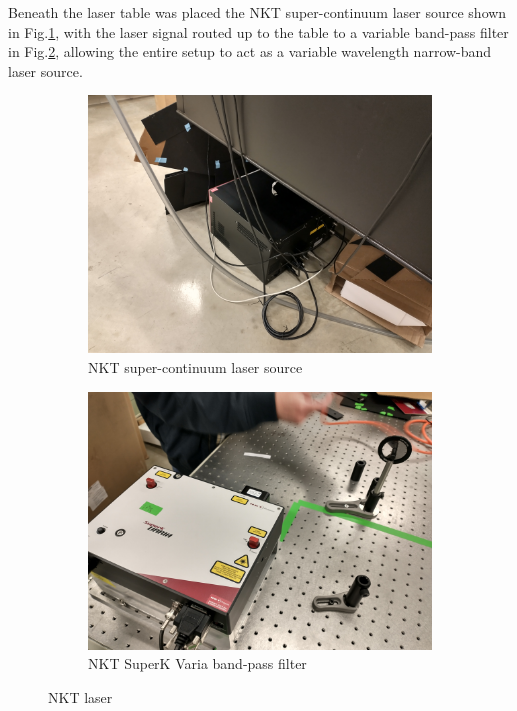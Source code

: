 \documentclass[a4paper]{article}
\begin{document}
Beneath the laser table was placed the NKT super-continuum laser source shown in Fig.\ref{fig:super_continuum}, with the laser signal routed up to the table to a variable band-pass filter in Fig.\ref{fig:band_pass}, allowing the entire setup to act as a variable wavelength narrow-band laser source.

\begin{figure}
     \centering
     \begin{subfigure}[b]{0.48\textwidth}
         \centering
         \includegraphics[width=\textwidth]{IMG_20220422_134723634_HDR.jpg}
         \caption{NKT super-continuum laser source}
         \label{fig:super_continuum}
     \end{subfigure}
     \hfill
     \begin{subfigure}[b]{0.48\textwidth}
         \centering
         \includegraphics[width=\textwidth]{IMG_20220422_134731107_HDR.jpg}
         \caption{NKT SuperK Varia band-pass filter}
         \label{fig:band_pass}
     \end{subfigure}
        \caption{NKT laser}
        \label{fig:NKT_laser_setup}
\end{figure}
\end{document}
